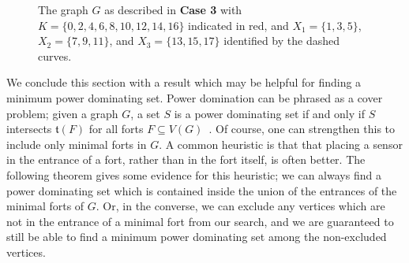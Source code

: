 \documentclass{article}
\begin{document}
\begin{figure}[htbp]
{
            }
            \caption{The graph $G$ as described in \textbf{Case 3} with $K = \{0,2,4,6 , 8, 10, 12, 14, 16\}$ indicated in red, and $X_1 = \{1,3,5\}$, $X_2 = \{7,9,11\}$, and $X_3 = \{13,15,17\}$ identified by the dashed curves.}
        \end{figure}


        We conclude this section with a result which may be helpful for finding a minimum power dominating set.
        Power domination can be phrased as a cover problem; given a graph $G$, a set $S$ is a power dominating set if and only if $S$ intersects $\mathfrak{t}(F)$ for all forts $F\subseteq V(G)$~\cite{SH2020}.
        Of course, one can strengthen this to include only minimal forts in $G$.
        A common heuristic is that that placing a sensor in the entrance of a fort, rather than in the fort itself, is often better.
        The following theorem gives some evidence for this heuristic; we can always find a power dominating set which is contained inside the union of the entrances of the minimal forts of $G$.
        Or, in the converse, we can exclude any vertices which are not in the entrance of a minimal fort from our search, and we are guaranteed to still be able to find a minimum power dominating set among the non-excluded vertices.
\end{document}
